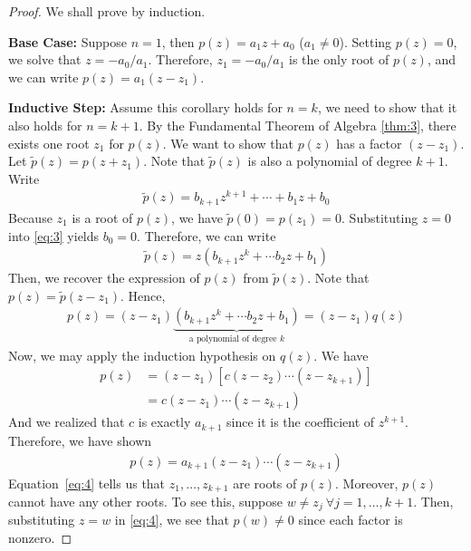 \documentclass[thmcnt=section, color=cyan, 12pt]{my-elegantbook}
\begin{document}
\begin{proof}
	We shall prove by induction.

	\noindent\textbf{Base Case:} Suppose $n = 1$, then $p(z) = a_1 z + a_0$ ($a_1 \neq 0$). Setting $p(z) = 0$, we solve that $z = -a_0 / a_1$. Therefore, $z_1 = -a_0 / a_1$ is the only root of $p(z)$, and we can write $p(z) = a_1(z - z_1)$.

	\noindent\textbf{Inductive Step:} Assume this corollary holds for $n = k$, we need to show that it also holds for $n = k + 1$.
	By the Fundamental Theorem of Algebra \ref{thm:3}, there exists one root $z_1$ for $p(z)$.
	We want to show that $p(z)$ has a factor $(z - z_1)$.
	Let $\tilde{p}(z) = p(z + z_1)$.
	Note that $\tilde{p}(z)$ is also a polynomial of degree $k + 1$.
	Write
	\begin{align}
		\tilde{p}(z) = b_{k+1} z^{k+1} + \cdots + b_1 z + b_0
		\label{eq:3}
	\end{align}
	Because $z_1$ is a root of $p(z)$, we have $\tilde{p}(0) = p(z_1) = 0$. Substituting $z=0$ into \eqref{eq:3} yields $b_0 = 0$.
	Therefore, we can write
	\begin{align*}
		\tilde{p}(z) = z (b_{k+1} z^{k} + \cdots b_2 z + b_1)
	\end{align*}
	Then, we recover the expression of $p(z)$ from $\tilde{p}(z)$.
	Note that $p(z) = \tilde{p}(z - z_1)$.
	Hence,
	\begin{align*}
		p(z) = (z - z_1) \underbrace{(b_{k+1} z^{k} + \cdots b_2 z + b_1)}_{\text{a polynomial of degree $k$}}
		= (z - z_1) q(z)
	\end{align*}
	Now, we may apply the induction hypothesis on $q(z)$.
	We have
	\begin{align*}
		p(z) & = (z - z_1) [c (z - z_2) \cdots (z - z_{k+1})] \\
		     & = c (z - z_1) \cdots (z - z_{k+1})
	\end{align*}
	And we realized that $c$ is exactly $a_{k+1}$ since it is the coefficient of $z^{k+1}$.
	Therefore, we have shown
	\begin{align}
		p(z) = a_{k+1} (z - z_1) \cdots (z - z_{k+1})
		\label{eq:4}
	\end{align}
	Equation~\eqref{eq:4} tells us that $z_1, \ldots, z_{k+1}$ are roots of $p(z)$.
	Moreover, $p(z)$ cannot have any other roots. To see this, suppose $w \neq z_j \ \forall j=1, \ldots, k+1$. Then, substituting $z = w$ in \eqref{eq:4}, we see that $p(w) \neq 0$ since each factor is nonzero.
\end{proof}
\end{document}

